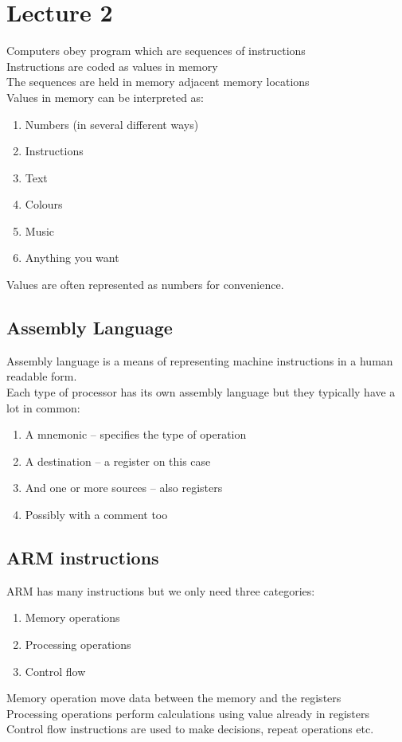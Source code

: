 \documentclass{article}
\begin{document}
\section{Lecture 2}
Computers obey program which are sequences of instructions\\
Instructions are coded as values in memory\\
The sequences are held in memory adjacent memory locations\\
Values in memory can be interpreted as:
\begin{enumerate}
\item Numbers (in several different ways)
\item Instructions
\item Text
\item Colours
\item Music
\item Anything you want
\end{enumerate}
Values are often represented as numbers for convenience.
\subsection{Assembly Language}
Assembly language is a means of representing machine instructions in a human readable form.\\
Each type of processor has its own assembly language but they typically have a lot in common:
\begin{enumerate}
\item A mnemonic – specifies the type of operation
\item A destination – a register on this case
\item And one or more sources – also registers
\item Possibly with a comment too
\end{enumerate}
\subsection{ARM instructions}
ARM has many instructions but we only need three categories:
\begin{enumerate}
\item Memory operations
\item Processing operations
\item Control flow
\end{enumerate}
Memory operation move data between the memory and the registers\\
Processing operations perform calculations using value already in registers\\
Control flow instructions are used to make decisions, repeat operations etc.
\end{document}
